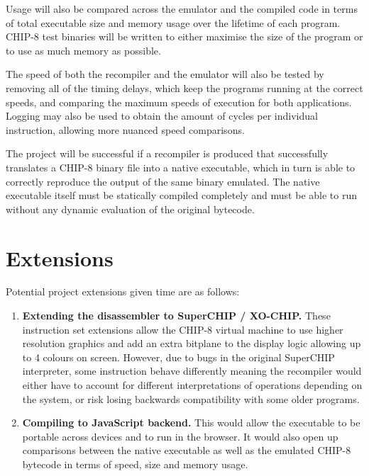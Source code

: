 \documentclass[12pt,a4paper,twoside]{article}
\begin{document}
Usage will also be compared across the emulator and the compiled code in terms of total executable size and memory usage over the lifetime of each program. CHIP-8 test binaries will be written to either maximise the size of the program or to use as much memory as possible. 

The speed of both the recompiler and the emulator will also be tested by removing all of the timing delays, which keep the programs running at the correct speeds, and comparing the maximum speeds of execution for both applications. Logging may also be used to obtain the amount of cycles per individual instruction, allowing more nuanced speed comparisons.

The project will be successful if a recompiler is produced that successfully translates a CHIP-8 binary file into a native executable, which in turn is able to correctly reproduce the output of the same binary emulated. The native executable itself must be statically compiled completely and must be able to run without any dynamic evaluation of the original bytecode.

\section*{Extensions}

Potential project extensions given time are as follows:

\begin{enumerate}

\item \textbf{Extending the disassembler to SuperCHIP / XO-CHIP.} These instruction set extensions allow the CHIP-8 virtual machine to use higher resolution graphics and add an extra bitplane to the display logic allowing up to 4 colours on screen. However, due to bugs in the original SuperCHIP interpreter, some instruction behave differently meaning the recompiler would either have to account for different interpretations of operations depending on the system, or risk losing backwards compatibility with some older programs.

\item \textbf{Compiling to JavaScript backend.} This would allow the executable to be portable across devices and to run in the browser. It would also open up comparisons between the native executable as well as the emulated CHIP-8 bytecode in terms of speed, size and memory usage.

\end{enumerate}
\end{document}
